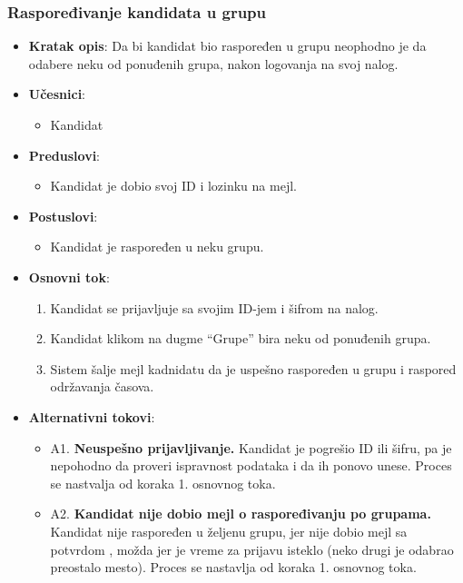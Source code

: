 \subsubsection{Raspoređivanje kandidata u grupu}
\label{subsubsec:grupe}
\begin{itemize}
  \item \textbf{Kratak opis}: Da bi kandidat bio raspoređen u grupu neophodno je da odabere neku od ponuđenih grupa, nakon logovanja na svoj nalog. 
  \item \textbf{Učesnici}: 
    \begin{itemize}
    \item  Kandidat
    \end{itemize}
  \item \textbf{Preduslovi}:
    \begin{itemize}
    \item Kandidat je dobio svoj ID i lozinku na mejl.
    \end{itemize}
  \item \textbf{Postuslovi}:
      \begin{itemize}
      \item Kandidat je raspoređen u neku grupu.
      \end{itemize}
  \item \textbf{Osnovni tok}:
      \begin{enumerate}
        \item Kandidat se prijavljuje sa svojim ID-jem i šifrom na nalog.
        \item Kandidat klikom na dugme “Grupe” bira neku od ponuđenih grupa.
        \item Sistem šalje mejl kadnidatu da je uspešno raspoređen u grupu i raspored održavanja časova.
      \end{enumerate}

  \item \textbf{Alternativni tokovi}:
      \begin{itemize}
        \item A1. \textbf{Neuspešno prijavljivanje.}
        Kandidat je pogrešio ID ili šifru, pa je nepohodno da proveri ispravnost podataka i da ih ponovo unese. Proces se nastvalja od koraka 1. osnovnog toka.
        \item A2. \textbf{Kandidat nije dobio mejl o raspoređivanju po grupama.}
        Kandidat nije raspoređen u željenu grupu, jer nije dobio mejl sa potvrdom , možda jer je vreme za prijavu isteklo (neko drugi je odabrao preostalo mesto). Proces se nastavlja od koraka 1. osnovnog toka.
      \end{itemize}
\end{itemize}

